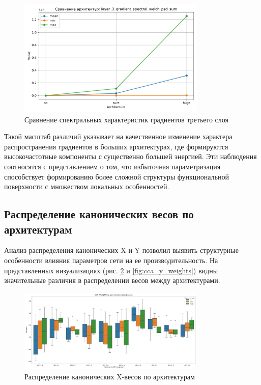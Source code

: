 \documentclass[a4paper,12pt]{article}
\begin{document}
\begin{figure}[ht]
  \centering
  \includegraphics[width=0.8\textwidth]{layer_3_gradient_spectral_welch_psd_sum_comparison.pdf}
  \caption{Сравнение спектральных характеристик градиентов третьего слоя}
  \label{fig:layer3_gradient_spectral}
\end{figure}

Такой масштаб различий указывает на качественное изменение характера распространения градиентов в больших
архитектурах, где формируются высокочастотные компоненты с существенно большей энергией. Эти наблюдения соотносятся
с представлением о том, что избыточная параметризация способствует формированию более сложной
структуры функциональной поверхности с множеством локальных особенностей.

\subsection{Распределение канонических весов по архитектурам}

Анализ распределения канонических X и Y позволил выявить структурные особенности влияния параметров
сети на ее производительность. На представленных визуализациях (рис. \ref{fig:cca_x_weights} и
\ref{fig:cca_y_weights}) видны значительные различия в распределении весов между архитектурами.

\begin{figure}[ht]
  \centering
  \includegraphics[width=0.8\textwidth]{cca_x_weights_all_shapes.pdf}
  \caption{Распределение канонических X-весов по архитектурам}
  \label{fig:cca_x_weights}
\end{figure}
\end{document}

